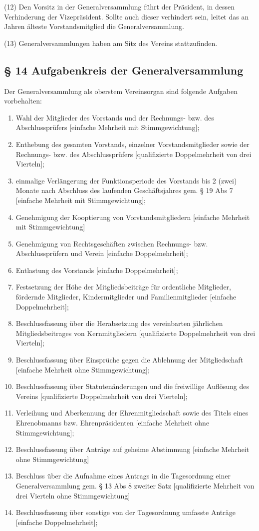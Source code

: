 \documentclass[11pt,a4paper]{article}
\begin{document}
(12)
Den Vorsitz in der Generalversammlung führt der Präsident, in dessen Verhinderung der Vizepräsident.
Sollte auch dieser verhindert sein, leitet das an Jahren älteste Vorstandsmitglied die Generalversammlung.

(13)
Generalversammlungen haben am Sitz des Vereins stattzufinden.

\subsection{§ 14
Aufgabenkreis der Generalversammlung}

Der Generalversammlung als oberstem Vereinsorgan sind folgende Aufgaben vorbehalten:

\begin{enumerate}[label=\alph*)]
\item
Wahl der Mitglieder des Vorstands und der Rechnungs- bzw. des Abschlussprüfers [einfache Mehrheit mit Stimmgewichtung];
\item
Enthebung des gesamten Vorstands, einzelner Vorstandsmitglieder sowie der Rechnungs- bzw. des Abschlussprüfers [qualifizierte Doppelmehrheit von drei Vierteln];
\item
einmalige Verlängerung der Funktionsperiode des Vorstands bis 2 (zwei) Monate nach Abschluss des laufenden Geschäftsjahres gem. § 19 Abs 7 [einfache Mehrheit mit Stimmgewichtung];
\item
Genehmigung der Kooptierung von Vorstandsmitgliedern [einfache Mehrheit mit Stimmgewichtung]
\item
Genehmigung von Rechtsgeschäften zwischen Rechnungs- bzw. Abschlussprüfern und Verein [einfache Doppelmehrheit];
\item
Entlastung des Vorstands [einfache Doppelmehrheit];
\item
Festsetzung der Höhe der Mitgliedsbeiträge für ordentliche Mitglieder, fördernde Mitglieder, Kindermitglieder und Familienmitglieder [einfache Doppelmehrheit];
\item
Beschlussfassung über die Herabsetzung des vereinbarten jährlichen Mitgliedsbeitrages von Kernmitgliedern [qualifizierte Doppelmehrheit von drei Vierteln];
\item
Beschlussfassung über Einsprüche gegen die Ablehnung der Mitgliedschaft [einfache Mehrheit ohne Stimmgewichtung];
\item
Beschlussfassung über Statutenänderungen und die freiwillige Auflösung des Vereins [qualifizierte Doppelmehrheit von drei Vierteln];
\item
Verleihung und Aberkennung der Ehrenmitgliedschaft sowie des Titels eines Ehrenobmanns bzw. Ehrenpräsidenten [einfache Mehrheit ohne Stimmgewichtung];
\item
Beschlussfassung über Anträge auf geheime Abstimmung [einfache Mehrheit ohne Stimmgewichtung]
\item
Beschluss über die Aufnahme eines Antrags in die Tagesordnung einer Generalversammlung gem. § 13 Abs 8 zweiter Satz [qualifizierte Mehrheit von drei Vierteln ohne Stimmgewichtung]
\item
Beschlussfassung über sonstige von der Tagesordnung umfasste Anträge [einfache Doppelmehrheit];
\end{enumerate}
\end{document}
